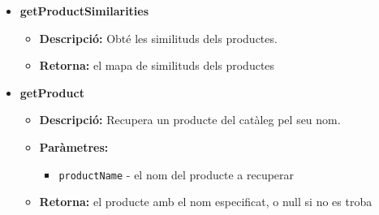 \documentclass[a4paper, t]{article}
\begin{document}
\begin{itemize}
\item \textbf{getProductSimilarities}
\begin{itemize}
    \item \textbf{Descripció:} Obté les similituds dels productes.
    \item \textbf{Retorna:} el mapa de similituds dels productes
\end{itemize}

\item \textbf{getProduct}
\begin{itemize}
    \item \textbf{Descripció:} Recupera un producte del catàleg pel seu nom.
    \item \textbf{Paràmetres:}
    \begin{itemize}
        \item \texttt{productName} - el nom del producte a recuperar
    \end{itemize}
    \item \textbf{Retorna:} el producte amb el nom especificat, o null si no es troba
\end{itemize}
\end{itemize}

\newpage
\end{document}
